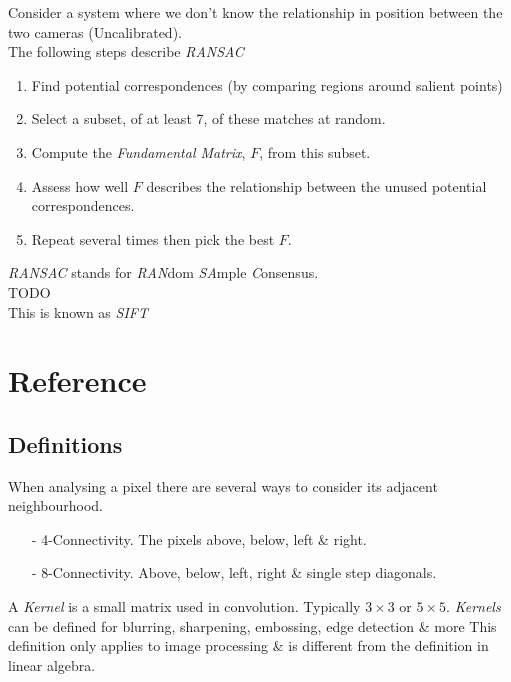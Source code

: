 \documentclass[11pt,a4paper]{article}
\begin{document}
Consider a system where we don't know the relationship in position between the two cameras (\ie Uncalibrated).\\
The following steps describe \textit{RANSAC}
\begin{enumerate}
	\item Find potential correspondences (\eg by comparing regions around salient points)
	\item Select a subset, of at least 7, of these matches at random.
	\item Compute the \textit{Fundamental Matrix}, $F$, from this subset.
	\item Assess how well $F$ describes the relationship between the unused potential correspondences.
	\item Repeat several times then pick the best $F$.
\end{enumerate}
\nb \textit{RANSAC} stands for \textit{RAN}dom \textit{SA}mple \textit{C}onsensus.\\

TODO\\
\nb This is known as \textit{SIFT}

\setcounter{section}{-1}
\section{Reference}

\subsection{Definitions}

When analysing a pixel there are several ways to consider its adjacent neighbourhood.
\begin{itemize}
	\item[-] 4-Connectivity. The pixels above, below, left \& right.
	\item[-] 8-Connectivity. Above, below, left, right \& single step diagonals.
\end{itemize}

A \textit{Kernel} is a small matrix used in convolution. Typically $3\times3$ or $5\times5$. \textit{Kernels} can be defined for blurring, sharpening, embossing, edge detection \& more
\nb This definition only applies to image processing \& is different from the definition in linear algebra.
\end{document}
